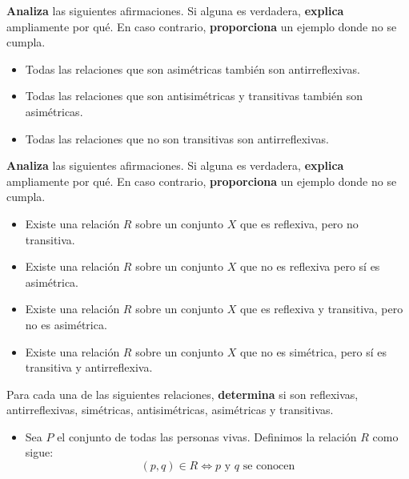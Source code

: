 \documentclass[oneside]{style}
\begin{document}
\begin{questions}[label=\protect\circled{\bfseries\arabic*}]
    \question
    {
        \textbf{Analiza} las siguientes afirmaciones. Si alguna es verdadera, 
        \textbf{explica} ampliamente por qué. En caso contrario, 
        \textbf{proporciona} un ejemplo donde no se cumpla. 
        \begin{itemize}
            \item Todas las relaciones que son asimétricas también son 
            antirreflexivas.
            \item Todas las relaciones que son antisimétricas y transitivas 
            también son asimétricas. 
            \item Todas las relaciones que no son transitivas son antirreflexivas.
        \end{itemize}
    }

    \question
    {
        \textbf{Analiza} las siguientes afirmaciones. Si alguna es verdadera, 
        \textbf{explica} ampliamente por qué. En caso contrario, 
        \textbf{proporciona} un ejemplo donde no se cumpla. 
        \begin{itemize}
            \item Existe una relación $R$ sobre un conjunto $X$ que es 
            reflexiva, pero no transitiva.  
            \item Existe una relación $R$ sobre un conjunto $X$ que no es 
            reflexiva pero sí es asimétrica. 
            \item Existe una relación $R$ sobre un conjunto $X$ que es 
            reflexiva y transitiva, pero no es asimétrica. 
            \item Existe una relación $R$ sobre un conjunto $X$ que no es 
            simétrica, pero sí es transitiva y antirreflexiva. 
        \end{itemize}
    }

    \question
    {
        Para cada una de las siguientes relaciones, \textbf{determina} si son 
        reflexivas, antirreflexivas, simétricas, antisimétricas, asimétricas y 
        transitivas. 
        \begin{itemize}
            \item Sea $P$ el conjunto de todas las personas vivas. Definimos la 
            relación $R$ como sigue: 
            \begin{equation*}
                (p,q) \in R \Leftrightarrow p \text{ y } q \text{ se conocen}
            \end{equation*} 


\end{itemize}}
\end{questions}
\end{document}
